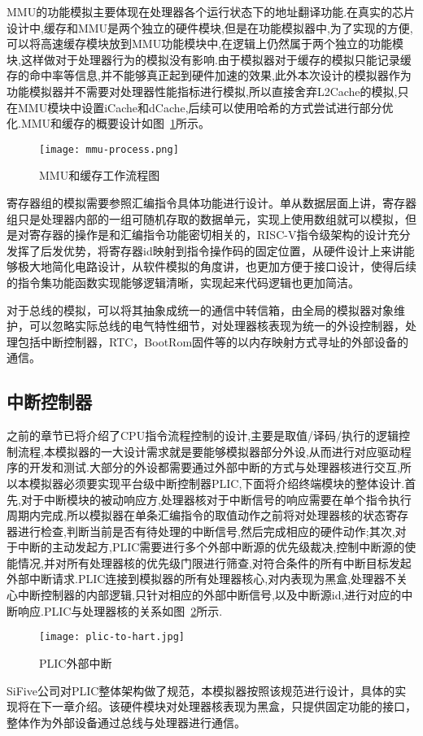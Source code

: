 MMU的功能模拟主要体现在处理器各个运行状态下的地址翻译功能.在真实的芯片设计中,缓存和MMU是两个独立的硬件模块,但是在功能模拟器中,为了实现的方便,可以将高速缓存模块放到MMU功能模块中,在逻辑上仍然属于两个独立的功能模块,这样做对于处理器行为的模拟没有影响.由于模拟器对于缓存的模拟只能记录缓存的命中率等信息,并不能够真正起到硬件加速的效果,此外本次设计的模拟器作为功能模拟器并不需要对处理器性能指标进行模拟,所以直接舍弃L2Cache的模拟,只在MMU模块中设置iCache和dCache,后续可以使用哈希的方式尝试进行部分优化.MMU和缓存的概要设计如图~\ref{fig:mmu-process}所示。
\begin{figure}[H]
  \centering
  \texttt{[image: mmu-process.png]}
  \caption{MMU和缓存工作流程图}
  \label{fig:mmu-process}
\end{figure}


寄存器组的模拟需要参照汇编指令具体功能进行设计。单从数据层面上讲，寄存器组只是处理器内部的一组可随机存取的数据单元，实现上使用数组就可以模拟，但是对寄存器的操作是和汇编指令功能密切相关的，RISC-V指令级架构的设计充分发挥了后发优势，将寄存器id映射到指令操作码的固定位置，从硬件设计上来讲能够极大地简化电路设计，从软件模拟的角度讲，也更加方便于接口设计，使得后续的指令集功能函数实现能够逻辑清晰，实现起来代码逻辑也更加简洁。


对于总线的模拟，可以将其抽象成统一的通信中转信箱，由全局的模拟器对象维护，可以忽略实际总线的电气特性细节，对处理器核表现为统一的外设控制器，处理包括中断控制器，RTC，BootRom固件等的以内存映射方式寻址的外部设备的通信。

\subsection{中断控制器}
之前的章节已将介绍了CPU指令流程控制的设计,主要是取值/译码/执行的逻辑控制流程,本模拟器的一大设计需求就是要能够模拟器部分外设,从而进行对应驱动程序的开发和测试.大部分的外设都需要通过外部中断的方式与处理器核进行交互,所以本模拟器必须要实现平台级中断控制器PLIC,下面将介绍终端模块的整体设计.首先,对于中断模块的被动响应方,处理器核对于中断信号的响应需要在单个指令执行周期内完成,所以模拟器在单条汇编指令的取值动作之前将对处理器核的状态寄存器进行检查,判断当前是否有待处理的中断信号,然后完成相应的硬件动作;其次,对于中断的主动发起方,PLIC需要进行多个外部中断源的优先级裁决,控制中断源的使能情况,并对所有处理器核的优先级门限进行筛查,对符合条件的所有中断目标发起外部中断请求.PLIC连接到模拟器的所有处理器核心,对内表现为黑盒,处理器不关心中断控制器的内部逻辑,只针对相应的外部中断信号,以及中断源id,进行对应的中断响应.PLIC与处理器核的关系如图~\ref{fig:plic-to-hart}所示.
\begin{figure}[H]
  \centering
  \texttt{[image: plic-to-hart.jpg]}
  \caption{PLIC外部中断}
  \label{fig:plic-to-hart}
\end{figure}
SiFive公司对PLIC整体架构做了规范，本模拟器按照该规范进行设计，具体的实现将在下一章介绍。该硬件模块对处理器核表现为黑盒，只提供固定功能的接口，整体作为外部设备通过总线与处理器进行通信。


